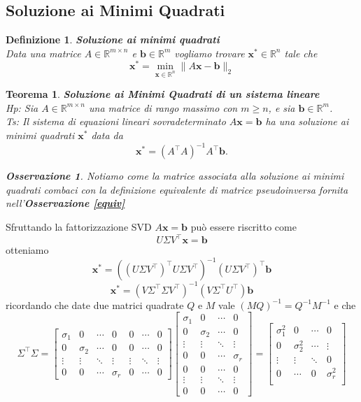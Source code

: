 \documentclass[11pt]{article}
\newtheorem{theorem}{Teorema}
\newtheorem{definition}{Definizione}
\newtheorem{oss}{\textit{Osservazione}}
\newcommand{\R}{\mathbb{R}}
\begin{document}
\subsection{Soluzione ai Minimi Quadrati}
\begin{definition}
\textbf{Soluzione ai minimi quadrati}\\
Data una matrice $A \in \R^{m \times n}$ e $ \mathbf{b} \in \R^m $  vogliamo trovare $\mathbf{x^*} \in \R^n$ tale che $$\mathbf{x^*} =	\min_{\mathbf{x} \in \R^{n}} \| A\mathbf{x} - \mathbf{b} \|_2 $$
\end{definition}
\begin{theorem}
\textbf{Soluzione ai Minimi Quadrati di un sistema lineare}\\
\textit{Hp:} Sia $A \in \mathbb{R}^{m \times n}$ una matrice di rango massimo con $m \geq n$, e sia $\mathbf{b} \in \mathbb{R}^m$.\\
\textit{Ts:} Il sistema di equazioni lineari sovradeterminato $A\mathbf{x} = \mathbf{b}$ ha una soluzione ai minimi quadrati $\mathbf{x}^*$ data da
\[
\mathbf{x}^* = (A^\top A)^{-1}A^\top \mathbf{b}.
\]
\begin{oss}\label{minquad_pseudoinv} Notiamo come la matrice associata alla soluzione ai minimi quadrati combaci con la definizione equivalente di matrice pseudoinversa fornita nell'\textit{\textbf{Osservazione \ref{equiv}}}
\end{oss}
\end{theorem} \noindent 
Sfruttando la fattorizzazione SVD $A\mathbf{x} = \mathbf{b}$ può essere riscritto come
\[
U  \Sigma  V ^\top \mathbf{x} = \mathbf{b}
\]
otteniamo
\[
\mathbf{x}^* = ((U  \Sigma  V^\top )^\top U \Sigma V^\top)^{-1}(U \Sigma  V^\top )^\top \mathbf{b}
\]
\[
\mathbf{x}^* = ( V \Sigma^\top \Sigma V^\top)^{-1}(V \Sigma^\top U^\top)\mathbf{b}
\]
ricordando che date due matrici quadrate $Q$ e $M$ vale $(MQ)^{-1} = Q^{-1}M^{-1}$ e che 
$$
\Sigma^\top \Sigma = 
\begin{bmatrix}
\sigma_1 & 0 & \cdots & 0 & 0 & \cdots & 0 \\
0 & \sigma_2 & \cdots & 0 & 0 & \cdots & 0 \\
\vdots & \vdots & \ddots & \vdots & \vdots & \ddots & \vdots \\
0 & 0 & \cdots & \sigma_r & 0 & \cdots & 0
\end{bmatrix}
\begin{bmatrix}
\sigma_1 & 0 & \cdots & 0 \\
0 & \sigma_2 & \cdots & 0 \\
\vdots & \vdots & \ddots & \vdots \\
0 & 0 & \cdots & \sigma_r \\
0 & 0 & \cdots & 0 \\
\vdots & \vdots & \ddots & \vdots \\
0 & 0 & \cdots & 0
\end{bmatrix}
=
\begin{bmatrix}
\sigma_1^2 & 0 & \cdots & 0 \\
0 & \sigma_2^2 & \cdots & \vdots \\
\vdots & \vdots & \ddots & 0  \\
0 & \cdots & 0 & \sigma_r^2  \\
\end{bmatrix}
$$ 
\end{document}
